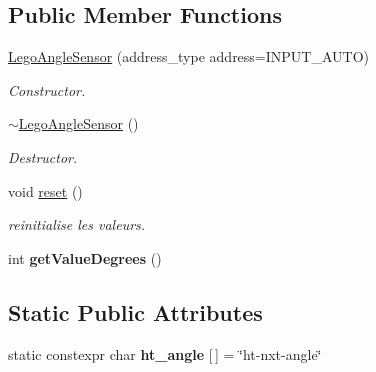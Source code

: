 \subsection*{Public Member Functions}
\begin{DoxyCompactItemize}
\item 
\mbox{\label{classLegoAngleSensor_a32f5513876f94833bd432a0957ed7850}} 
\hyperlink{classLegoAngleSensor_a32f5513876f94833bd432a0957ed7850}{Lego\+Angle\+Sensor} (address\+\_\+type address=I\+N\+P\+U\+T\+\_\+\+A\+U\+TO)
\begin{DoxyCompactList}\small\item\em Constructor. \end{DoxyCompactList}\item 
\mbox{\label{classLegoAngleSensor_a2ea2c61e8cdbb86fac7c5e6ee60b25ee}} 
\hyperlink{classLegoAngleSensor_a2ea2c61e8cdbb86fac7c5e6ee60b25ee}{$\sim$\+Lego\+Angle\+Sensor} ()
\begin{DoxyCompactList}\small\item\em Destructor. \end{DoxyCompactList}\item 
\mbox{\label{classLegoAngleSensor_ad7e348dff998062a9f8ba4cbd220743d}} 
void \hyperlink{classLegoAngleSensor_ad7e348dff998062a9f8ba4cbd220743d}{reset} ()
\begin{DoxyCompactList}\small\item\em reinitialise les valeurs. \end{DoxyCompactList}\item 
\mbox{\label{classLegoAngleSensor_ac93975bab5f00be42cfd7ccceb6930c0}} 
int {\bfseries get\+Value\+Degrees} ()
\end{DoxyCompactItemize}
\subsection*{Static Public Attributes}
\begin{DoxyCompactItemize}
\item 
\mbox{\label{classLegoAngleSensor_a432037ad045c3e8672145e24620dd87f}} 
static constexpr char {\bfseries ht\+\_\+angle} \mbox{[}$\,$\mbox{]} = \char`\"{}ht-\/nxt-\/angle\char`\"{}
\end{DoxyCompactItemize}
